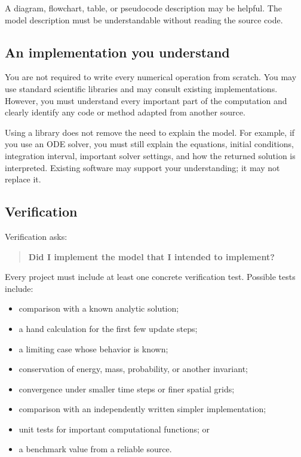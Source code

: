 \documentclass[11pt]{article}
\begin{document}
A diagram, flowchart, table, or pseudocode description may be helpful. The model
description must be understandable without reading the source code.

\subsection{An implementation you understand}

You are not required to write every numerical operation from scratch. You may
use standard scientific libraries and may consult existing implementations.
However, you must understand every important part of the computation and clearly
identify any code or method adapted from another source.

Using a library does not remove the need to explain the model. For example, if
you use an ODE solver, you must still explain the equations, initial conditions,
integration interval, important solver settings, and how the returned solution
is interpreted. Existing software may support your understanding; it may not
replace it.

\subsection{Verification}

Verification asks:

\begin{quote}
\textbf{Did I implement the model that I intended to implement?}
\end{quote}

Every project must include at least one concrete verification test. Possible
tests include:

\begin{itemize}
  \item comparison with a known analytic solution;
  \item a hand calculation for the first few update steps;
  \item a limiting case whose behavior is known;
  \item conservation of energy, mass, probability, or another invariant;
  \item convergence under smaller time steps or finer spatial grids;
  \item comparison with an independently written simpler implementation;
  \item unit tests for important computational functions; or
  \item a benchmark value from a reliable source.
\end{itemize}
\end{document}
